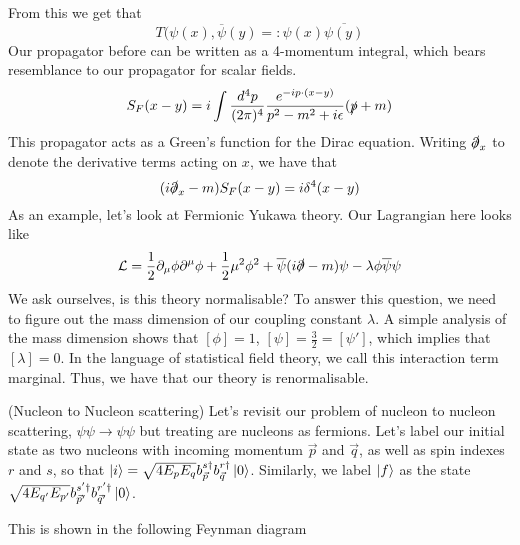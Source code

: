 From this we get that 
\[
T ( \psi ( x) , \overline{ \psi  }( y )  = : \psi ( x) \overline{ \psi ( y ) } 
\]
Our propagator before can be written as 
a 4-momentum integral, which bears resemblance to 
our propagator for scalar fields. 
\[
S _ F ( x - y ) = i \int \frac{ d ^ 4 p }{ ( 2 \pi )^{ 4 }  } \frac{e ^{  - ip \cdot  
( x -y ) } }{ p ^ 2 - m ^2 + i \epsilon } (\slashed{p} + m ) 
\] 
This propagator acts as a Green's function for the Dirac equation. 
Writing $\slashed{\partial} _ x $ to denote the derivative 
terms acting on $ x $, we have that 
\[
( i \slashed{\partial}_ x - m ) S_ F ( x- y ) = i \delta ^ 4 ( x- y ) 
\] As an example, let's look at 
Fermionic Yukawa theory. Our Lagrangian here looks like 
\[
\mathcal{ L } = \frac{1}{2 } \partial  _ \mu \phi \partial  ^ \mu \phi 
+ \frac{1}{2 } \mu ^ 2 \phi ^ 2 + \overline{ \psi } ( i \slashed{\partial} - m ) \psi 
- \lambda \phi \overline{ \psi } \psi 
\] We ask ourselves, is this 
theory normalisable? To answer this 
question, we need to figure out the mass dimension of 
our coupling constant $ \lambda $. A simple analysis of the mass dimension shows that 
$ [ \phi ] = 1 $, $ [ \psi ] = \frac{3}{2 }  = [ \psi ' ] $, which 
implies that $ [ \lambda  ]  = 0$. 
In the language of statistical 
field theory, we call this 
interaction term marginal. Thus, we have that our theory is renormalisable.

\begin{example}{(Nucleon to Nucleon scattering)}
Let's revisit our problem of 
nucleon to nucleon scattering, $ \psi \psi \to \psi \psi $ but treating 
are nucleons as fermions. Let's 
label our initial state as two nucleons with incoming momentum $ \vec{p}$  
and $ \vec{q}$, as well as spin indexes $ r $ and $ s$,  so that $ \ket{ i }  = \sqrt{ 4 E_{ p }  E_{ q }  } b_{\vec{p} } ^{ s \dagger } b_{ \vec{q} } ^{ r \dagger } \ket{ 0 } $. 
Similarly, we label $ \ket{ f} $ as the state $ \sqrt{ 4 E_{q' }  E_{ p ' }  }  b_{ \vec{p} ' } ^{ s ' \dagger } b_{ \vec{q} ' } ^{ r' \dagger } \ket{ 0 } $. 

This is shown in the following Feynman diagram 

\end{example}

